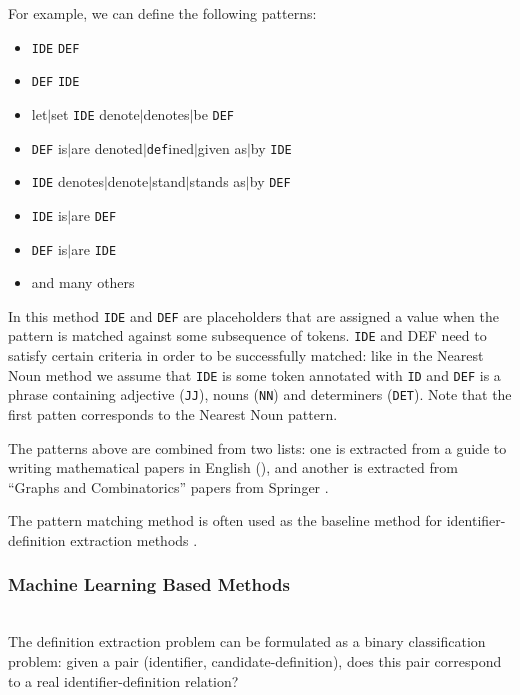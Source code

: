 For example, we can define the following patterns:

\begin{itemize}
\itemsep1pt\parskip0pt
  \item \texttt{IDE} \texttt{DEF}
  \item \texttt{DEF} \texttt{IDE}
  \item let$|$set \texttt{IDE} denote$|$denotes$|$be \texttt{DEF}
  \item \texttt{DEF} is$|$are denoted$|$\texttt{def}ined$|$given as$|$by \texttt{IDE}
  \item \texttt{IDE} denotes$|$denote$|$stand$|$stands as$|$by \texttt{DEF}
  \item \texttt{IDE} is$|$are \texttt{DEF}
  \item \texttt{DEF} is$|$are \texttt{IDE}
  \item and many others
\end{itemize}


In this method \texttt{IDE} and \texttt{DEF} are placeholders that are
assigned a value when the pattern is matched against some subsequence
of tokens.  \texttt{IDE} and DEF need to
satisfy certain criteria in order to be successfully matched: like in the
Nearest Noun method we assume that \texttt{IDE} is some token annotated with
\texttt{ID} and \texttt{DEF} is a phrase containing adjective (\texttt{JJ}),
nouns (\texttt{NN}) and  determiners (\texttt{DET}). Note that the first patten corresponds
to the Nearest Noun pattern.

The patterns above are combined from two lists: one is extracted from a 
guide to writing mathematical papers in English (\cite{trzeciak1995writing}), 
and another is extracted from ``Graphs and Combinatorics'' papers from Springer
\cite{kristianto2012extracting}. 

The pattern matching method is often used as the baseline method
for identifier-definition extraction methods \cite{kristianto2012extracting}
\cite{kristianto2014extracting} \cite{pagael2014mlp}.


\subsubsection{Machine Learning Based Methods}

\ \\

The definition extraction problem can be formulated as a binary classification
problem: given a pair (identifier, candidate-definition), does this pair
correspond to a real identifier-definition relation?

